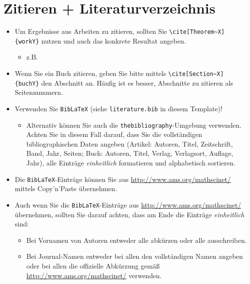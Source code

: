 \section{Zitieren + Literaturverzeichnis}

\begin{itemize}
  \item Um Ergebnisse aus Arbeiten zu zitieren, sollten Sie \verb$\cite[Theorem~X]{workY}$ nutzen und auch das konkrete Resultat angeben.
        \begin{itemize}
          \item z.B.\ \cite[Theorem~4]{MR3457440}
        \end{itemize}

  \item Wenn Sie ein Buch zitieren, geben Sie bitte mittels \verb$\cite[Section~X]{buchY}$
        den Abschnitt an. Häufig ist es besser, Abschnitte zu zitieren als Seitennummern.

  \item Verwenden Sie \verb$BibLaTeX$ (siehe \verb$literature.bib$ in diesem Template)!
        \begin{itemize}
          \item Alternativ können Sie auch die \verb$thebibliography$-Umgebung verwenden. Achten Sie in diesem Fall darauf, dass Sie die vollständigen bibliographischen Daten angeben (Artikel: Autoren, Titel, Zeitschrift, Band, Jahr, Seiten; Buch: Autoren, Titel, Verlag, Verlagsort, Auflage, Jahr), alle Einträge \emph{einheitlich} formatieren und alphabetisch sortieren.
        \end{itemize}

  \item Die \verb$BibLaTeX$-Einträge können Sie aus \url{http://www.ams.org/mathscinet/} mittels Copy'n'Paste überneh\-men.
  \item Auch wenn Sie die \verb$BibLaTeX$-Einträge aus \url{http://www.ams.org/mathscinet/} über\-neh\-men, sollten Sie darauf achten, dass am Ende die Einträge \emph{einheitlich} sind:
        \begin{itemize}
          \item Bei Vornamen von Autoren entweder alle abkürzen oder alle ausschreiben.
          \item Bei Journal-Namen entweder bei allen den vollständigen Namen angeben oder
                bei allen die offizielle Abkürzung gemäß \url{http://www.ams.org/mathscinet/} verwenden.
        \end{itemize}

\end{itemize}

